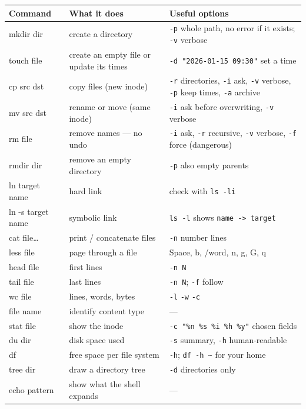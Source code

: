\documentclass[11pt,a4paper]{article}
\newcommand{\cmd}[1]{\texttt{#1}}
\begin{document}
{\footnotesize
\renewcommand{\arraystretch}{1.15}
\begin{longtable}{@{}>{\ttfamily}p{3.3cm} p{5.2cm} >{\raggedright\arraybackslash}p{6.0cm}@{}}
\toprule
\textrm{\textbf{Command}} & \textbf{What it does} & \textbf{Useful options} \\
\midrule
\endhead
mkdir dir & create a directory & \cmd{-p} whole path, no error if it exists; \cmd{-v} verbose \\
touch file & create an empty file or update its times & \cmd{-d "2026-01-15 09:30"} set a time \\
cp src dst & copy files (new inode) & \cmd{-r} directories, \cmd{-i} ask, \cmd{-v} verbose, \cmd{-p} keep times, \cmd{-a} archive \\
mv src dst & rename or move (same inode) & \cmd{-i} ask before overwriting, \cmd{-v} verbose \\
rm file & remove names --- no undo & \cmd{-i} ask, \cmd{-r} recursive, \cmd{-v} verbose, \cmd{-f} force (dangerous) \\
rmdir dir & remove an empty directory & \cmd{-p} also empty parents \\
ln target name & hard link & check with \cmd{ls -li} \\
ln -s target name & symbolic link & \cmd{ls -l} shows \texttt{name -> target} \\
cat file\dots & print / concatenate files & \cmd{-n} number lines \\
less file & page through a file & Space, b, /word, n, g, G, q \\
head file & first lines & \cmd{-n N} \\
tail file & last lines & \cmd{-n N}; \cmd{-f} follow \\
wc file & lines, words, bytes & \cmd{-l} \cmd{-w} \cmd{-c} \\
file name & identify content type & --- \\
stat file & show the inode & \cmd{-c "\%n \%s \%i \%h \%y"} chosen fields \\
du dir & disk space used & \cmd{-s} summary, \cmd{-h} human-readable \\
df & free space per file system & \cmd{-h}; \cmd{df -h \textasciitilde} for your home \\
tree dir & draw a directory tree & \cmd{-d} directories only \\
echo pattern & show what the shell expands & --- \\
\bottomrule
\end{longtable}
}
\end{document}
